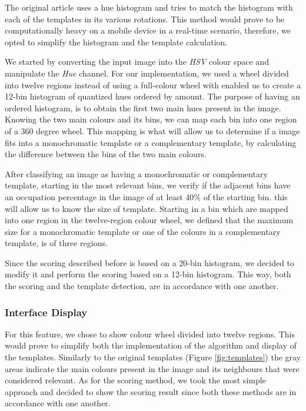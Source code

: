 The original article uses a hue histogram and tries to match the histogram with each of the templates in its various rotations. This method would prove to be computationally heavy on a mobile device in a real-time scenario, therefore, we opted to simplify the histogram and the template calculation. 

We started by converting the input image into the \emph{HSV} colour space and manipulate the \emph{Hue} channel. For our implementation, we used a wheel divided into twelve regions instead of using a full-colour wheel with enabled us to create a 12-bin histogram of quantized hues ordered by amount. The purpose of having an ordered histogram, is to obtain the first two main hues present in the image. Knowing the two main colours and its bins, we can map each bin into one region of a 360 degree wheel. This mapping is what will allow us to determine if a image fits into a monochromatic template or a complementary template, by calculating the difference between the bins of the two main colours.

After classifying an image as having a monochromatic or complementary template, starting in the most relevant bins, we verify if the adjacent bins have an occupation percentage in the image of at least 40\% of the starting bin. this will allow us to know the size of template. Starting in a bin which are mapped into one region in the twelve-region colour wheel, we defined that the maximum size for a monochromatic template or one of the colours in a complementary template, is of three regions.

Since the scoring described before is based on a 20-bin histogram, we decided to modify it and perform the scoring based on a 12-bin histogram. This way, both the scoring and the template detection, are in accordance with one another.

\subsubsection{Interface Display}

For this feature, we chose to show colour wheel divided into twelve regions. This would prove to simplify both the implementation of the algorithm and display of the templates. Similarly to the original templates (Figure \ref{fig:templates}) the gray areas indicate the main colours present in the image and its neighbours that were considered relevant.
As for the scoring method, we took the most simple approach and decided to show the scoring result since both these methods are in accordance with one another.

